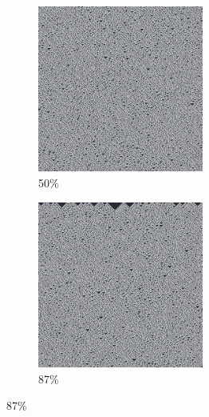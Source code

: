 \documentclass[12pt, fleqn]{report}                             %
\theoremstyle{break}                                            %
\begin{document}
\begin{figure}[ht!]
\begin{subfigure}[b]{0.4\linewidth}
          \includegraphics[width=0.6\textwidth]{Images/30/c.png}
          \caption{50\%}
        \end{subfigure}
        \begin{subfigure}[b]{0.4\linewidth}
          \includegraphics[width=0.6\textwidth]{Images/30/d.png}
          \caption{87\%}
        \end{subfigure}
      \end{figure}
\end{document}
